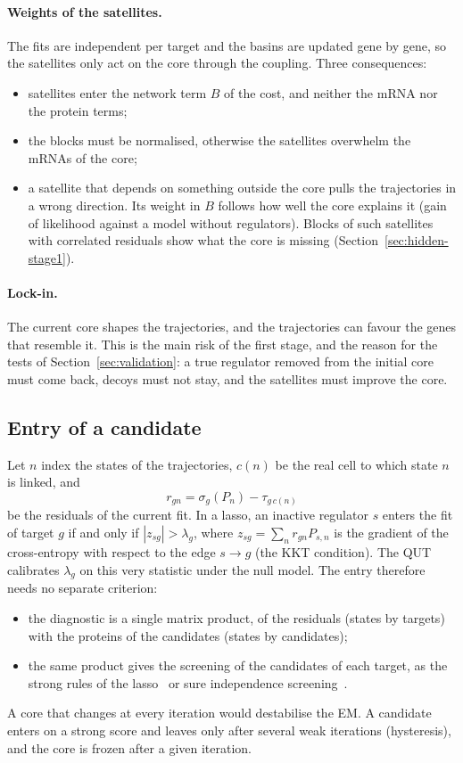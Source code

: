 \documentclass[a4paper, 11pt]{article}
\theoremstyle{plain}
\theoremstyle{remark}
\begin{document}
\paragraph{Weights of the satellites.} The fits are independent per target and the basins are updated gene by gene, so the satellites only act on the core through the coupling. Three consequences:
\begin{itemize}[nosep]
\item satellites enter the network term $B$ of the cost, and neither the mRNA nor the protein terms;
\item the blocks must be normalised, otherwise the satellites overwhelm the mRNAs of the core;
\item a satellite that depends on something outside the core pulls the trajectories in a wrong direction. Its weight in $B$ follows how well the core explains it (gain of likelihood against a model without regulators). Blocks of such satellites with correlated residuals show what the core is missing (Section~\ref{sec:hidden-stage1}).
\end{itemize}

\paragraph{Lock-in.} The current core shapes the trajectories, and the trajectories can favour the genes that resemble it. This is the main risk of the first stage, and the reason for the tests of Section~\ref{sec:validation}: a true regulator removed from the initial core must come back, decoys must not stay, and the satellites must improve the core.

\subsection{Entry of a candidate}\label{sec:entry}

Let $n$ index the states of the trajectories, $c(n)$ be the real cell to which state $n$ is linked, and
\[
r_{gn} = \sigma_g(P_n) - \tau_{g\,c(n)}
\]
be the residuals of the current fit. In a lasso, an inactive regulator $s$ enters the fit of target $g$ if and only if $|z_{sg}| > \lambda_g$, where $z_{sg} = \sum_n r_{gn} P_{s,n}$ is the gradient of the cross-entropy with respect to the edge $s \to g$ (the KKT condition). The QUT~\cite{giacobino2017quantile} calibrates $\lambda_g$ on this very statistic under the null model. The entry therefore needs no separate criterion:
\begin{itemize}[nosep]
\item the diagnostic is a single matrix product, of the residuals (states by targets) with the proteins of the candidates (states by candidates);
\item the same product gives the screening of the candidates of each target, as the strong rules of the lasso~\cite{tibshirani2012strong} or sure independence screening~\cite{fan2008sure}.
\end{itemize}
A core that changes at every iteration would destabilise the EM. A candidate enters on a strong score and leaves only after several weak iterations (hysteresis), and the core is frozen after a given iteration.
\end{document}

